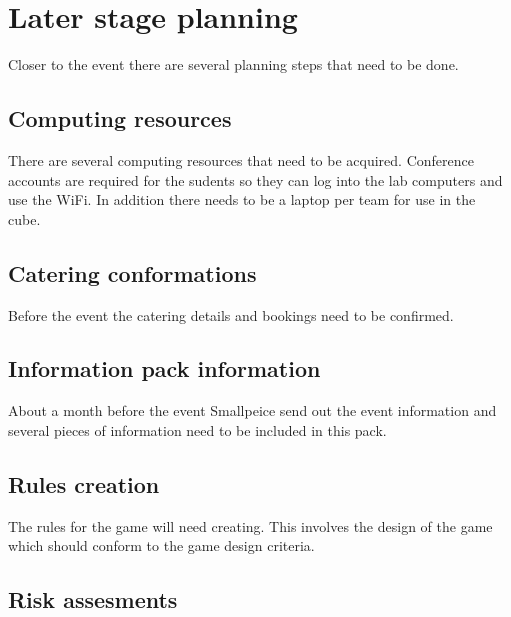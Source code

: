 \section{Later stage planning}

Closer to the event there are several planning steps that need to be done.

\subsection{Computing resources}

There are several computing resources that need to be acquired.
Conference accounts are required for the sudents so they can log into the lab computers and use the WiFi.
In addition there needs to be a laptop per team for use in the cube.


\subsection{Catering conformations}

Before the event  the catering details and bookings need to be confirmed.


\subsection{Information pack information}

About a month before the event Smallpeice send out the event information and several pieces of information need to be included in this pack.


\subsection{Rules creation}

The rules for the game will need creating.
This involves the design of the game which should conform to the game design criteria.


\subsection{Risk assesments}

